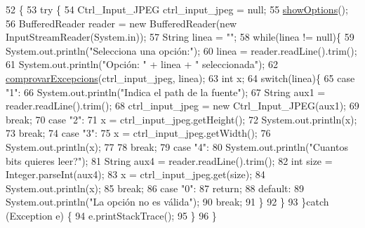 \begin{DoxyCode}
52                                            \{
53     \textcolor{keywordflow}{try} \{
54         Ctrl\_Input\_JPEG ctrl\_input\_jpeg = null;
55         \hyperlink{classpersistencia_1_1input_1_1Driver____Ctrl__Input__JPEG_a3ffde336b648d23ae0a517210d0f8f38}{showOptions}();
56         BufferedReader reader = \textcolor{keyword}{new} BufferedReader(\textcolor{keyword}{new} InputStreamReader(System.in));
57         String linea = \textcolor{stringliteral}{""};
58         \textcolor{keywordflow}{while}(linea != null)\{
59             System.out.println(\textcolor{stringliteral}{"Selecciona una opción:"});
60             linea = reader.readLine().trim();
61             System.out.println(\textcolor{stringliteral}{"Opción: "} + linea + \textcolor{stringliteral}{" seleccionada"});
62             \hyperlink{classpersistencia_1_1input_1_1Driver____Ctrl__Input__JPEG_ad40099d3188e58f93a2a57c4277b754e}{comprovarExcepcions}(ctrl\_input\_jpeg, linea);
63             \textcolor{keywordtype}{int} x;
64             \textcolor{keywordflow}{switch}(linea)\{
65                 \textcolor{keywordflow}{case} \textcolor{stringliteral}{"1"}:
66                     System.out.println(\textcolor{stringliteral}{"Indica el path de la fuente"});
67                     String aux1 = reader.readLine().trim();
68                     ctrl\_input\_jpeg = \textcolor{keyword}{new} Ctrl\_Input\_JPEG(aux1);
69                 \textcolor{keywordflow}{break};
70                 \textcolor{keywordflow}{case} \textcolor{stringliteral}{"2"}:
71                     x = ctrl\_input\_jpeg.getHeight();
72                     System.out.println(x);
73                 \textcolor{keywordflow}{break};
74                 \textcolor{keywordflow}{case} \textcolor{stringliteral}{"3"}:
75                     x = ctrl\_input\_jpeg.getWidth();
76                     System.out.println(x);
77 
78                 \textcolor{keywordflow}{break};
79                 \textcolor{keywordflow}{case} \textcolor{stringliteral}{"4"}:
80                     System.out.println(\textcolor{stringliteral}{"Cuantos bits quieres leer?"});
81                     String aux4 = reader.readLine().trim();
82                     \textcolor{keywordtype}{int} size = Integer.parseInt(aux4);
83                     x = ctrl\_input\_jpeg.get(size);
84                     System.out.println(x);
85                 \textcolor{keywordflow}{break};
86                 \textcolor{keywordflow}{case} \textcolor{stringliteral}{"0"}:
87                     \textcolor{keywordflow}{return};
88                 \textcolor{keywordflow}{default}:
89                     System.out.println(\textcolor{stringliteral}{"La opción no es válida"});
90                 \textcolor{keywordflow}{break};
91             \}
92         \}
93     \}\textcolor{keywordflow}{catch} (Exception e) \{
94         e.printStackTrace();
95     \}
96     \}
\end{DoxyCode}
